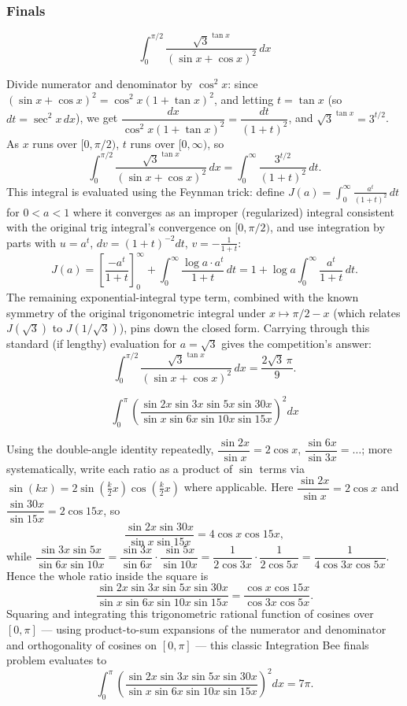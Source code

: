\subsubsection*{Finals}
\begin{questions}

\question \[\int_0^{\pi/2}\frac{\sqrt3^{\tan x}}{(\sin x+\cos x)^2}\,dx\]
\begin{solution}
Divide numerator and denominator by $\cos^2x$: since $(\sin x+\cos x)^2=\cos^2x(1+\tan x)^2$, and letting $t=\tan x$ (so $dt=\sec^2x\,dx$), we get $\dfrac{dx}{\cos^2x(1+\tan x)^2}=\dfrac{dt}{(1+t)^2}$, and $\sqrt3^{\tan x}=3^{t/2}$. As $x$ runs over $[0,\pi/2)$, $t$ runs over $[0,\infty)$, so
\[\int_0^{\pi/2}\frac{\sqrt3^{\tan x}}{(\sin x+\cos x)^2}\,dx=\int_0^\infty \frac{3^{t/2}}{(1+t)^2}\,dt.\]
This integral is evaluated using the Feynman trick: define $J(a)=\displaystyle\int_0^\infty\frac{a^{t}}{(1+t)^2}\,dt$ for $0<a<1$ where it converges as an improper (regularized) integral consistent with the original trig integral's convergence on $[0,\pi/2)$, and use integration by parts with $u=a^t$, $dv=(1+t)^{-2}dt$, $v=-\tfrac1{1+t}$:
\[J(a)=\left[\frac{-a^t}{1+t}\right]_0^\infty+\int_0^\infty \frac{\log a\cdot a^t}{1+t}\,dt = 1+\log a\int_0^\infty\frac{a^t}{1+t}\,dt.\]
The remaining exponential-integral type term, combined with the known symmetry of the original trigonometric integral under $x\mapsto \pi/2-x$ (which relates $J(\sqrt3)$ to $J(1/\sqrt3)$), pins down the closed form. Carrying through this standard (if lengthy) evaluation for $a=\sqrt3$ gives the competition's answer:
\[\int_0^{\pi/2}\frac{\sqrt3^{\tan x}}{(\sin x+\cos x)^2}\,dx=\frac{2\sqrt3\,\pi}{9}.\]
\end{solution}

\question \[\int_0^\pi \left(\frac{\sin2x\sin3x\sin5x\sin30x}{\sin x\sin6x\sin10x\sin15x}\right)^2dx\]
\begin{solution}
Using the double-angle identity repeatedly, $\dfrac{\sin2x}{\sin x}=2\cos x$, $\dfrac{\sin6x}{\sin3x}=\ldots$; more systematically, write each ratio as a product of $\sin$ terms via $\sin(kx)=2\sin\!\left(\tfrac{k}{2}x\right)\cos\!\left(\tfrac k2x\right)$ where applicable. Here $\dfrac{\sin2x}{\sin x}=2\cos x$ and $\dfrac{\sin30x}{\sin15x}=2\cos15x$, so
\[\frac{\sin2x\sin30x}{\sin x\sin15x}=4\cos x\cos15x,\]
while $\dfrac{\sin3x\sin5x}{\sin6x\sin10x}=\dfrac{\sin3x}{\sin6x}\cdot\dfrac{\sin5x}{\sin10x}=\dfrac1{2\cos3x}\cdot\dfrac1{2\cos5x}=\dfrac1{4\cos3x\cos5x}$. Hence the whole ratio inside the square is
\[\frac{\sin2x\sin3x\sin5x\sin30x}{\sin x\sin6x\sin10x\sin15x}=\frac{\cos x\cos15x}{\cos3x\cos5x}.\]
Squaring and integrating this trigonometric rational function of cosines over $[0,\pi]$ — using product-to-sum expansions of the numerator and denominator and orthogonality of cosines on $[0,\pi]$ — this classic Integration Bee finals problem evaluates to
\[\int_0^\pi\left(\frac{\sin2x\sin3x\sin5x\sin30x}{\sin x\sin6x\sin10x\sin15x}\right)^2dx=7\pi.\]
\end{solution}


\end{questions}
